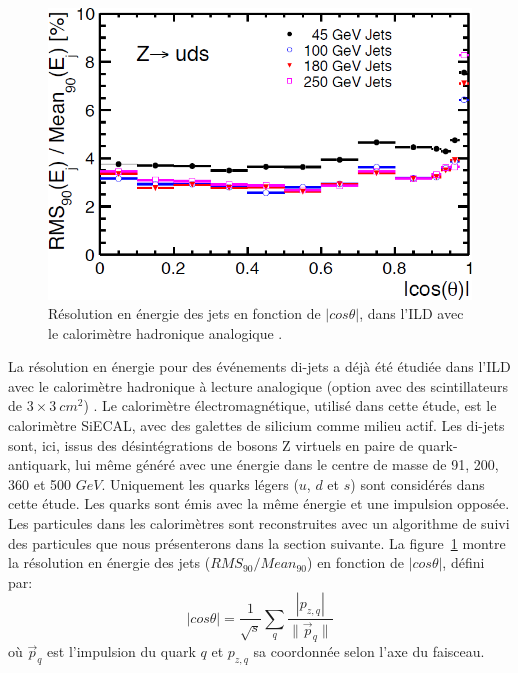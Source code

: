 \begin{figure}[!ht]
  \centering
  \includegraphics[width=.8\textwidth]{ILD/figs/ResVsCosTheta_ahcal.png}
  \caption{Résolution en énergie des jets en fonction de $|cos\theta|$, dans l'ILD avec le calorimètre hadronique analogique \cite{detectorTDR}.}
  \label{fig:resvscostheta_ahcal}
\end{figure}
La résolution en énergie pour des événements di-jets a déjà été étudiée dans l'ILD avec le calorimètre hadronique à lecture analogique (option avec des scintillateurs de $3\times3~cm^2$) \cite{detectorTDR}. Le calorimètre électromagnétique, utilisé dans cette étude, est le calorimètre SiECAL, avec des galettes de silicium comme milieu actif. Les di-jets sont, ici, issus des désintégrations de bosons Z virtuels en paire de quark-antiquark, lui même généré avec une énergie dans le centre de masse de 91, 200, 360 et 500 $GeV$. Uniquement les quarks légers ($u$, $d$ et $s$) sont considérés dans cette étude. Les quarks sont émis avec la même énergie et une impulsion opposée. Les particules dans les calorimètres sont reconstruites avec un algorithme de suivi des particules que nous présenterons dans la section suivante. La figure~\ref{fig:resvscostheta_ahcal} montre la résolution en énergie des jets ($RMS_{90}/Mean_{90}$) en fonction de $|cos\theta|$, défini par:
\begin{equation}
  |cos\theta| = \frac{1}{\sqrt s}\sum_q{\frac{|p_{z,q}|}{\|\vec p_{q}\|}}
\end{equation}
où $\vec p_{q}$ est l'impulsion du quark $q$ et $p_{z,q}$ sa coordonnée selon l'axe du faisceau.

